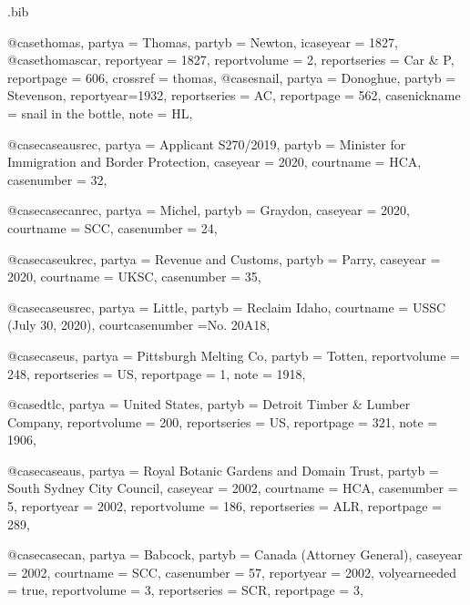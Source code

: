 \begin{filecontents*}[overwrite]{\jobname.bib}


@case{thomas,
  partya = {Thomas},
  partyb = {Newton},
  icaseyear = {1827},
	}
@case{thomascar,
  reportyear = {1827},
  reportvolume = {2},
  reportseries = {Car \& P},
  reportpage = {606},
  crossref = {thomas},
}
@case{snail,
  partya = {Donoghue}, 
  partyb = {Stevenson},
  reportyear={1932},
  reportseries = {AC},
  reportpage = {562},
  casenickname = {snail in the bottle},
  note = {HL},
	}



@case{caseausrec,
  partya = {Applicant S270/2019}, 
  partyb = {Minister for Immigration and Border Protection},
  caseyear = {2020},
  courtname = {HCA},
  casenumber = {32},
	}

@case{casecanrec,
  partya = {Michel}, 
  partyb = {Graydon},
  caseyear = {2020},
  courtname = {SCC},
  casenumber = {24},
	}


@case{caseukrec,
  partya = {Revenue and Customs}, 
  partyb = {Parry},
  caseyear = {2020},
  courtname = {UKSC},
  casenumber = {35},
	}

@case{caseusrec,
  partya = {Little}, 
  partyb = {Reclaim Idaho},
  courtname = {USSC (July 30, 2020)},
  courtcasenumber ={No. 20A18},
	}

@case{caseus,
  partya = {Pittsburgh Melting Co},
  partyb = {Totten},
  reportvolume = {248},
  reportseries = {US},
  reportpage = {1},
  note = {1918},
}

@case{dtlc,
  partya = {United States},
  partyb = {Detroit Timber \& Lumber Company},
  reportvolume = {200},
  reportseries = {US},
  reportpage = {321},
  note = {1906},
}

@case{caseaus,
  partya = {Royal Botanic Gardens and Domain Trust}, 
  partyb = {South Sydney City Council},
  caseyear = {2002},
  courtname = {HCA},
  casenumber = {5},
  reportyear = {2002},
  reportvolume = {186},
  reportseries = {ALR},
  reportpage = {289},
	}

@case{casecan,
  partya = {Babcock}, 
  partyb = {Canada (Attorney General)},
  caseyear = {2002},
  courtname = {SCC},
  casenumber = {57},
  reportyear = {2002},
  volyearneeded = {true},
  reportvolume = {3},
  reportseries = {SCR},
  reportpage = {3},
	}



\end{filecontents*}
